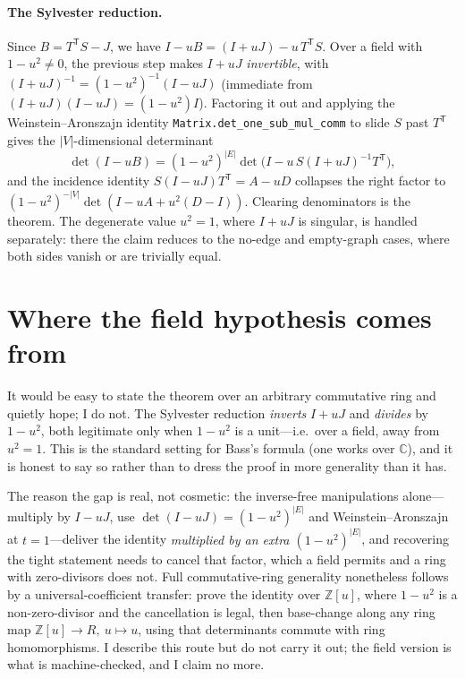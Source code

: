\documentclass[11pt]{article}
\newcommand{\lean}[1]{\texttt{#1}}
\newcommand{\Z}{\mathbb{Z}}
\begin{document}
\paragraph{The Sylvester reduction.}
Since $B=T^{\mathsf T}S-J$, we have $I-uB=(I+uJ)-u\,T^{\mathsf T}S$. Over a field with $1-u^2\neq0$,
the previous step makes $I+uJ$ \emph{invertible}, with $(I+uJ)^{-1}=(1-u^2)^{-1}(I-uJ)$ (immediate
from $(I+uJ)(I-uJ)=(1-u^2)I$). Factoring it out and applying the Weinstein--Aronszajn identity
\lean{Matrix.det\_one\_sub\_mul\_comm} to slide $S$ past $T^{\mathsf T}$ gives the
$|V|$-dimensional determinant
\[
  \det(I-uB)=(1-u^2)^{|E|}\det\!\bigl(I-u\,S(I+uJ)^{-1}T^{\mathsf T}\bigr),
\]
and the incidence identity $S(I-uJ)T^{\mathsf T}=A-uD$ collapses the right factor to
$(1-u^2)^{-|V|}\det(I-uA+u^2(D-I))$. Clearing denominators is the theorem. The degenerate value
$u^2=1$, where $I+uJ$ is singular, is handled separately: there the claim reduces to the no-edge and
empty-graph cases, where both sides vanish or are trivially equal.

\section{Where the field hypothesis comes from}
\label{sec:field}

It would be easy to state the theorem over an arbitrary commutative ring and quietly hope; I do not.
The Sylvester reduction \emph{inverts} $I+uJ$ and \emph{divides} by $1-u^2$, both legitimate only
when $1-u^2$ is a unit---i.e.\ over a field, away from $u^2=1$. This is the standard setting for
Bass's formula (one works over $\mathbb{C}$), and it is honest to say so rather than to dress the
proof in more generality than it has.

The reason the gap is real, not cosmetic: the inverse-free manipulations alone---multiply by
$I-uJ$, use $\det(I-uJ)=(1-u^2)^{|E|}$ and Weinstein--Aronszajn at $t=1$---deliver the identity
\emph{multiplied by an extra $(1-u^2)^{|E|}$}, and recovering the tight statement needs to cancel
that factor, which a field permits and a ring with zero-divisors does not. Full commutative-ring
generality nonetheless follows by a universal-coefficient transfer: prove the identity over
$\Z[u]$, where $1-u^2$ is a non-zero-divisor and the cancellation is legal, then base-change along
any ring map $\Z[u]\to R,\ u\mapsto u$, using that determinants commute with ring homomorphisms. I
describe this route but do not carry it out; the field version is what is machine-checked, and I
claim no more.
\end{document}
